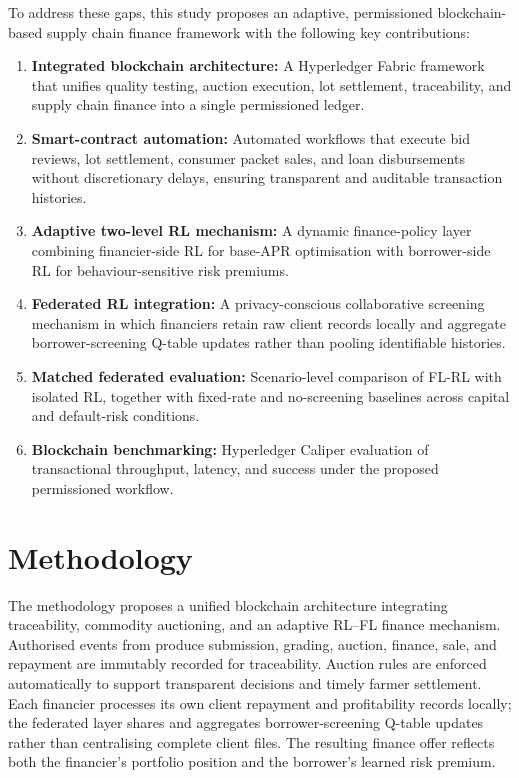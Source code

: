 \documentclass[12pt]{article}
\begin{document}
	To address these gaps, this study proposes an adaptive, permissioned blockchain-based supply chain finance framework with the following key contributions:
	
	\begin{enumerate}[leftmargin=*]
		\item \textbf{Integrated blockchain architecture:} A Hyperledger Fabric framework that unifies quality testing, auction execution, lot settlement, traceability, and supply chain finance into a single permissioned ledger.
		\item \textbf{Smart-contract automation:} Automated workflows that execute bid reviews, lot settlement, consumer packet sales, and loan disbursements without discretionary delays, ensuring transparent and auditable transaction histories.
		\item \textbf{Adaptive two-level RL mechanism:} A dynamic finance-policy layer combining financier-side RL for base-APR optimisation with borrower-side RL for behaviour-sensitive risk premiums.
		\item \textbf{Federated RL integration:} A privacy-conscious collaborative screening mechanism in which financiers retain raw client records locally and aggregate borrower-screening Q-table updates rather than pooling identifiable histories.
		\item \textbf{Matched federated evaluation:} Scenario-level comparison of FL-RL with isolated RL, together with fixed-rate and no-screening baselines across capital and default-risk conditions.
		\item \textbf{Blockchain benchmarking:} Hyperledger Caliper evaluation of transactional throughput, latency, and success under the proposed permissioned workflow.
	\end{enumerate}
	
	\section{Methodology}
	
	
	
	
	The methodology proposes a unified blockchain architecture integrating traceability, commodity auctioning, and an adaptive RL--FL finance mechanism. Authorised events from produce submission, grading, auction, finance, sale, and repayment are immutably recorded for traceability. Auction rules are enforced automatically to support transparent decisions and timely farmer settlement. Each financier processes its own client repayment and profitability records locally; the federated layer shares and aggregates borrower-screening Q-table updates rather than centralising complete client files. The resulting finance offer reflects both the financier's portfolio position and the borrower's learned risk premium.
	
\end{document}
